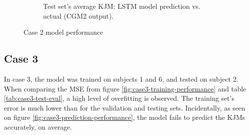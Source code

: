 \documentclass[../main.tex]{subfiles}
\begin{document}
\begin{figure}[!htb]
\begin{subfigure}[b]{0.515\textwidth}
         \caption{Test set's average \ac{KJM}; LSTM model prediction vs. actual (CGM2 output).}
         \label{fig:case2-prediction-performance}
     \end{subfigure}
    \caption{Case 2 model performance}
    \label{fig:case2-performance-plots}
\end{figure}


\subsection{Case 3}
\label{sec:results-case3}
In case 3, the model was trained on subjects 1 and 6, and tested on subject 2.
When comparing the \ac{MSE} from figure \ref{fig:case3-training-performance} and table \ref{tab:case3-test-eval}, a high level of overfitting is observed.
The training set's error is much lower than for the validation and testing sets.
Incidentally, as seen on figure \ref{fig:case3-prediction-performance}, the model fails to predict the \acp{KJM} accurately, on average.
\end{document}
